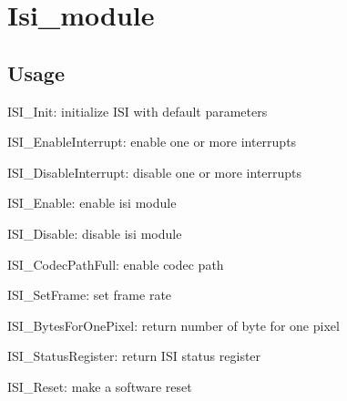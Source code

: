 \hypertarget{group__isi__module}{}\section{Isi\+\_\+module}
\label{group__isi__module}
\hypertarget{group__isi__module_gmac_usage}{}\subsection{Usage}\label{group__isi__module_gmac_usage}

\begin{DoxyItemize}
\item I\+S\+I\+\_\+\+Init\+: initialize I\+SI with default parameters
\item I\+S\+I\+\_\+\+Enable\+Interrupt\+: enable one or more interrupts
\item I\+S\+I\+\_\+\+Disable\+Interrupt\+: disable one or more interrupts
\item I\+S\+I\+\_\+\+Enable\+: enable isi module
\item I\+S\+I\+\_\+\+Disable\+: disable isi module
\item I\+S\+I\+\_\+\+Codec\+Path\+Full\+: enable codec path
\item I\+S\+I\+\_\+\+Set\+Frame\+: set frame rate
\item I\+S\+I\+\_\+\+Bytes\+For\+One\+Pixel\+: return number of byte for one pixel
\item I\+S\+I\+\_\+\+Status\+Register\+: return I\+SI status register
\item I\+S\+I\+\_\+\+Reset\+: make a software reset 
\end{DoxyItemize}